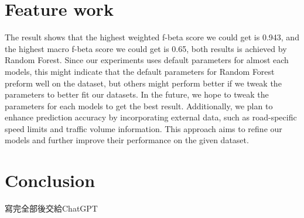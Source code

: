 \documentclass[10pt,twocolumn,letterpaper]{article}
\begin{document}
\begin{CJK}{UTF8}{bsmi}
\section{Feature work}
The result shows that the highest weighted f-beta score we could get is 0.943, and the highest macro f-beta score we could get is 0.65, both results is achieved by Random Forest. Since our experiments uses default parameters for almost each models, this might indicate that the default parameters for Random Forest preform well on the dataset, but others might perform better if we tweak the parameters to better fit our datasets. In the future, we hope to tweak the parameters for each models to get the best result. Additionally, we plan to enhance prediction accuracy by incorporating external data, such as road-specific speed limits and traffic volume information. This approach aims to refine our models and further improve their performance on the given dataset.

\section{Conclusion}
寫完全部後交給ChatGPT

{\small


}

\end{CJK}
\end{document}
